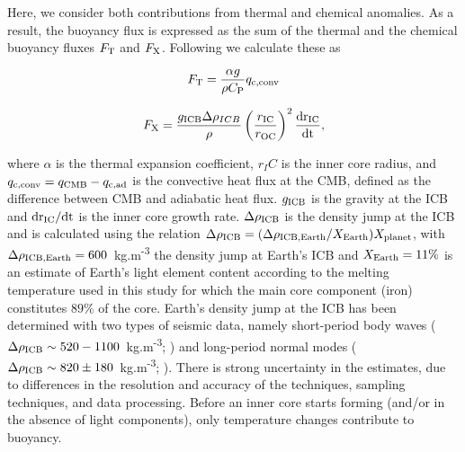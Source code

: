 \documentclass[draft]{agujournal2019} %
\begin{document}
Here, we consider both contributions from thermal and chemical anomalies. As a result, the buoyancy flux is expressed as the sum of the thermal and the chemical buoyancy fluxes $F_{\rm T}$ and $F_{\rm X}$. Following  we calculate these as
\begin{linenomath*}
\begin{equation}
    F_{\rm T} = \frac{\alpha g}{\rho C_{\rm P}}q_{\rm c,conv}
\end{equation}
\end{linenomath*}
\begin{linenomath*}
\begin{equation}   
    F_{\rm X} = \frac{g_{\rm ICB} \Delta \rho_{ICB}}{\rho}\left(\frac{r_{\rm IC}}{r_{\rm OC}}\right)^{\rm 2} \frac{\rm{d}r_{IC}}{\rm{d}t},
\label{eq:chem_buoyancy}
\end{equation}
\end{linenomath*}
where $\alpha$ is the thermal expansion coefficient, $r_IC$ is the inner core radius, and $q_{\rm c, conv}=q_{\rm CMB} - q_{\rm c,ad}$ is the convective heat flux at the CMB, defined as the difference between CMB and adiabatic heat flux. $g_{\rm ICB}$ is the gravity at the ICB and $\rm{d}r_{IC}/\rm{d}t$ is the inner core growth rate. $\Delta \rho_{\rm ICB}$ is the density jump at the ICB and is calculated using the relation $\Delta \rho_{\rm ICB} = (\Delta \rho_{\rm ICB,Earth}/{X_{\rm Earth}})X_{\rm planet}$, with $\Delta \rho_{\rm ICB, Earth}=600$~kg.m\textsuperscript{-3} the density jump at Earth's ICB and $X_{\rm Earth} = 11\%$ is an estimate of Earth's light element content according to the melting temperature used in this study for which the main core component (iron) constitutes $89\%$ of the core. Earth's density jump at the ICB has been determined with two types of seismic data, namely short-period body waves ($\Delta \rho_{\rm ICB}\sim 520-1100$~kg.m\textsuperscript{-3}; ) and long-period normal modes ($\Delta \rho_{\rm ICB}\sim 820 \pm 180$~kg.m\textsuperscript{-3}; ). There is strong uncertainty in the estimates, due to differences in the resolution and accuracy of the techniques, sampling techniques, and data processing. Before an inner core starts forming (and/or in the absence of light components), only temperature changes contribute to buoyancy.
\end{document}
